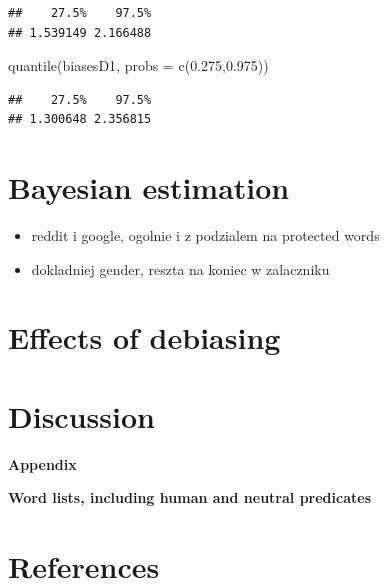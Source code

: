 \documentclass[
  10pt,
  dvipsnames,enabledeprecatedfontcommands]{scrartcl}
\newenvironment{Shaded}{\begin{snugshade}}{\end{snugshade}}
\newcommand{\AttributeTok}[1]{\textcolor[rgb]{0.77,0.63,0.00}{#1}}
\newcommand{\FloatTok}[1]{\textcolor[rgb]{0.00,0.00,0.81}{#1}}
\newcommand{\FunctionTok}[1]{\textcolor[rgb]{0.00,0.00,0.00}{#1}}
\newcommand{\NormalTok}[1]{#1}
\begin{document}
\begin{verbatim}
##    27.5%    97.5% 
## 1.539149 2.166488
\end{verbatim}

\begin{Shaded}
\begin{Highlighting}[]
\FunctionTok{quantile}\NormalTok{(biasesD1, }\AttributeTok{probs =} \FunctionTok{c}\NormalTok{(}\FloatTok{0.275}\NormalTok{,}\FloatTok{0.975}\NormalTok{))}
\end{Highlighting}
\end{Shaded}

\begin{verbatim}
##    27.5%    97.5% 
## 1.300648 2.356815
\end{verbatim}

\normalsize

\hypertarget{bayesian-estimation}{%
\section{Bayesian estimation}\label{bayesian-estimation}}

\begin{itemize}
\item
  reddit i google, ogolnie i z podzialem na protected words
\item
  dokladniej gender, reszta na koniec w zalaczniku
\end{itemize}

\hypertarget{effects-of-debiasing}{%
\section{Effects of debiasing}\label{effects-of-debiasing}}

\hypertarget{discussion}{%
\section{Discussion}\label{discussion}}

\newpage

\noindent \huge  \textbf{Appendix} \normalsize

\noindent \Large \textbf{Word lists, including human and neutral predicates}
\normalsize

\hypertarget{references}{%
\section*{References}\label{references}}
\end{document}
